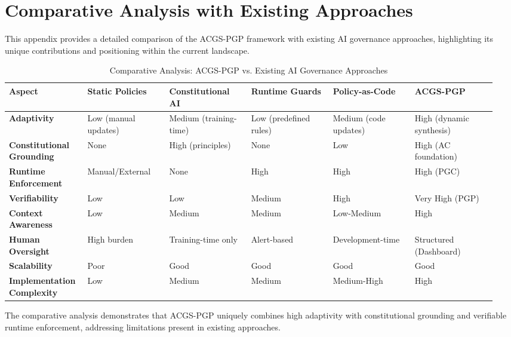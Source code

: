 \documentclass[sigconf,review,anonymous=false]{acmart} %
\begin{document}
\section{Comparative Analysis with Existing Approaches}
\label{app:comparative_analysis}
This appendix provides a detailed comparison of the ACGS-PGP framework with existing AI governance approaches, highlighting its unique contributions and positioning within the current landscape.

\begin{table}[!ht]
  \caption{Comparative Analysis: ACGS-PGP vs. Existing AI Governance Approaches}
  \label{tab:comparative_analysis}
  {\footnotesize
  \begin{tabular}{@{}p{0.15\linewidth}p{0.16\linewidth}p{0.16\linewidth}p{0.16\linewidth}p{0.16\linewidth}p{0.16\linewidth}@{}}
    \toprule
    \textbf{Aspect} & \textbf{Static Policies} & \textbf{Constitutional AI} & \textbf{Runtime Guards} & \textbf{Policy-as-Code} & \textbf{ACGS-PGP} \\
    \midrule
    \textbf{Adaptivity} & Low (manual updates) & Medium (training-time) & Low (predefined rules) & Medium (code updates) & High (dynamic synthesis) \\
    \addlinespace
    \textbf{Constitutional Grounding} & None & High (principles) & None & Low & High (AC foundation) \\
    \addlinespace
    \textbf{Runtime Enforcement} & Manual/External & None & High & High & High (PGC) \\
    \addlinespace
    \textbf{Verifiability} & Low & Low & Medium & High & Very High (PGP) \\
    \addlinespace
    \textbf{Context Awareness} & Low & Medium & Medium & Low-Medium & High \\
    \addlinespace
    \textbf{Human Oversight} & High burden & Training-time only & Alert-based & Development-time & Structured (Dashboard) \\
    \addlinespace
    \textbf{Scalability} & Poor & Good & Good & Good & Good \\
    \addlinespace
    \textbf{Implementation Complexity} & Low & Medium & Medium & Medium-High & High \\
    \bottomrule
  \end{tabular}
  }
\end{table}

The comparative analysis demonstrates that ACGS-PGP uniquely combines high adaptivity with constitutional grounding and verifiable runtime enforcement, addressing limitations present in existing approaches.
\end{document}
